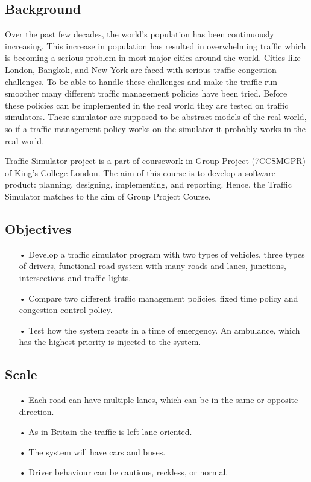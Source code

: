 \documentclass[11pt]{article}
\begin{document}
\subsection{Background}
Over the past few decades, the world's population has been continuously increasing. This increase in population has resulted in overwhelming traffic which is becoming a serious problem in most major cities around the world. Cities like London, Bangkok, and New York are faced with serious traffic congestion challenges. To be able to handle these challenges and make the traffic run smoother many different traffic management policies have been tried. Before these policies can be implemented in the real world they are tested on traffic simulators. These simulator are supposed to be abstract models of the real world, so if a traffic management policy works on the simulator it probably works in the real world.

Traffic Simulator project is a part of coursework in Group Project (7CCSMGPR) of King’s College London. The aim of this course is to develop a software product: planning, designing, implementing, and reporting. Hence, the Traffic Simulator matches to the aim of Group Project Course.

\subsection{Objectives}
\begin{itemize}
\item[•] Develop a traffic simulator program with two types of vehicles, three types of drivers, functional road system with many roads and lanes, junctions, intersections and traffic lights.
\item[•] Compare two different traffic management policies, fixed time policy and congestion control policy.
\item[•] Test how the system reacts in a time of emergency. An ambulance, which has the highest priority is injected to the system.
\end{itemize}

\subsection{Scale}
\begin{itemize}
\item[•] Each road can have multiple lanes, which can be in the same or opposite direction.
\item[•] As in Britain the traffic is left-lane oriented.
\item[•] The system will have cars and buses.
\item[•] Driver behaviour can be cautious, reckless, or normal.
\end{itemize}
\end{document}
